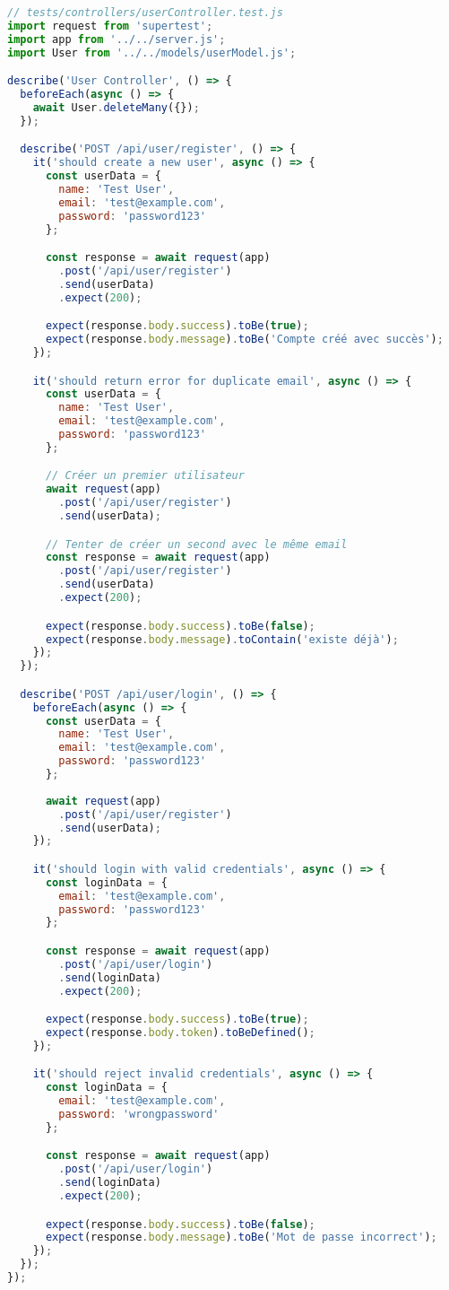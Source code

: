 \begin{lstlisting}[language=JavaScript, caption=Test du contrôleur utilisateur]
// tests/controllers/userController.test.js
import request from 'supertest';
import app from '../../server.js';
import User from '../../models/userModel.js';

describe('User Controller', () => {
  beforeEach(async () => {
    await User.deleteMany({});
  });

  describe('POST /api/user/register', () => {
    it('should create a new user', async () => {
      const userData = {
        name: 'Test User',
        email: 'test@example.com',
        password: 'password123'
      };

      const response = await request(app)
        .post('/api/user/register')
        .send(userData)
        .expect(200);

      expect(response.body.success).toBe(true);
      expect(response.body.message).toBe('Compte créé avec succès');
    });

    it('should return error for duplicate email', async () => {
      const userData = {
        name: 'Test User',
        email: 'test@example.com',
        password: 'password123'
      };

      // Créer un premier utilisateur
      await request(app)
        .post('/api/user/register')
        .send(userData);

      // Tenter de créer un second avec le même email
      const response = await request(app)
        .post('/api/user/register')
        .send(userData)
        .expect(200);

      expect(response.body.success).toBe(false);
      expect(response.body.message).toContain('existe déjà');
    });
  });

  describe('POST /api/user/login', () => {
    beforeEach(async () => {
      const userData = {
        name: 'Test User',
        email: 'test@example.com',
        password: 'password123'
      };
      
      await request(app)
        .post('/api/user/register')
        .send(userData);
    });

    it('should login with valid credentials', async () => {
      const loginData = {
        email: 'test@example.com',
        password: 'password123'
      };

      const response = await request(app)
        .post('/api/user/login')
        .send(loginData)
        .expect(200);

      expect(response.body.success).toBe(true);
      expect(response.body.token).toBeDefined();
    });

    it('should reject invalid credentials', async () => {
      const loginData = {
        email: 'test@example.com',
        password: 'wrongpassword'
      };

      const response = await request(app)
        .post('/api/user/login')
        .send(loginData)
        .expect(200);

      expect(response.body.success).toBe(false);
      expect(response.body.message).toBe('Mot de passe incorrect');
    });
  });
});
\end{lstlisting}

